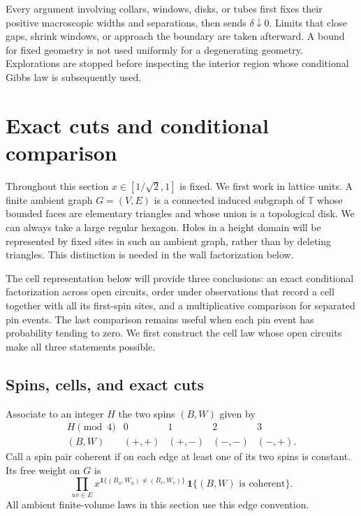 \documentclass[11pt]{article}
\theoremstyle{definition}
\theoremstyle{remark}
\numberwithin{equation}{section}
\begin{document}
Every argument involving collars, windows, disks, or tubes first fixes
their positive macroscopic widths and separations, then sends
$\delta\downarrow0$.  Limits that close gaps, shrink windows, or approach
the boundary are taken afterward.  A bound for fixed geometry is not
used uniformly for a degenerating geometry.  Explorations are stopped
before inspecting the interior region whose conditional Gibbs law is
subsequently used.

\section{Exact cuts and conditional comparison}\label{sec:discrete}

Throughout this section $x\in[1/\sqrt2,1]$ is fixed. We first work in lattice
units. A finite ambient graph $G=(V,E)$ is a connected induced subgraph of
$\mathbb T$ whose bounded faces are elementary triangles and whose union is a
topological disk. We can always take a
large regular hexagon. Holes in a height domain will be represented by fixed
sites in such an ambient graph, rather than by deleting triangles. This
distinction is needed in the wall factorization below.

The cell representation below will provide three conclusions: an exact conditional
factorization across open circuits, order under observations that record a
cell together with all its first-spin sites, and a multiplicative comparison
for separated pin events.  The last comparison remains useful when each pin
event has probability tending to zero.  We first construct the cell law
whose open circuits make all three statements possible.

\subsection{Spins, cells, and exact cuts}

Associate to an integer $H$ the two spins $(B,W)$ given by
\begin{equation}\label{discrete:gray}
\begin{array}{c|cccc}
H\pmod4&0&1&2&3\\ \hline
(B,W)&(+,+)&(+,-)&(-,-)&(-,+).
\end{array}
\end{equation}
Call a spin pair coherent if on each edge at least one of its two spins is
constant. Its free weight on $G$ is
\begin{equation}\label{discrete:pair-weight}
 \prod_{uv\in E}x^{\mathbf 1\{(B_u,W_u)\ne(B_v,W_v)\}}\,
 \mathbf 1\{(B,W)\text{ is coherent}\}.
\end{equation}
All ambient finite-volume laws in this section use this edge convention.
\end{document}
